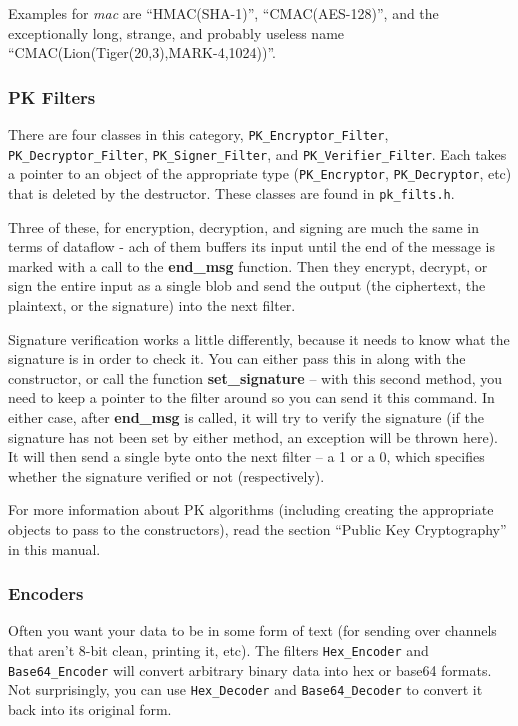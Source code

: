 \documentclass{article}
\newcommand{\filename}[1]{\texttt{#1}}
\newcommand{\function}[1]{\textbf{#1}}
\newcommand{\type}[1]{\texttt{#1}}
\renewcommand{\arg}[1]{\textsl{#1}}
\begin{document}
Examples for \arg{mac} are ``HMAC(SHA-1)'', ``CMAC(AES-128)'', and the
exceptionally long, strange, and probably useless name
``CMAC(Lion(Tiger(20,3),MARK-4,1024))''.

\subsubsection{PK Filters}

There are four classes in this category, \type{PK\_Encryptor\_Filter},
\type{PK\_Decryptor\_Filter}, \type{PK\_Signer\_Filter}, and
\type{PK\_Verifier\_Filter}. Each takes a pointer to an object of the
appropriate type (\type{PK\_Encryptor}, \type{PK\_Decryptor}, etc) that is
deleted by the destructor. These classes are found in \filename{pk\_filts.h}.

Three of these, for encryption, decryption, and signing are much the
same in terms of dataflow - ach of them buffers its input until the
end of the message is marked with a call to the \function{end\_msg}
function. Then they encrypt, decrypt, or sign the entire input as a
single blob and send the output (the ciphertext, the plaintext, or the
signature) into the next filter.

Signature verification works a little differently, because it needs to
know what the signature is in order to check it. You can either pass
this in along with the constructor, or call the function
\function{set\_signature} -- with this second method, you need to keep
a pointer to the filter around so you can send it this command. In
either case, after \function{end\_msg} is called, it will try to
verify the signature (if the signature has not been set by either
method, an exception will be thrown here). It will then send a single
byte onto the next filter -- a 1 or a 0, which specifies whether the
signature verified or not (respectively).

For more information about PK algorithms (including creating the
appropriate objects to pass to the constructors), read the section
``Public Key Cryptography'' in this manual.

\subsubsection{Encoders}

Often you want your data to be in some form of text (for sending over channels
that aren't 8-bit clean, printing it, etc). The filters \type{Hex\_Encoder}
and \type{Base64\_Encoder} will convert arbitrary binary data into hex or
base64 formats. Not surprisingly, you can use \type{Hex\_Decoder} and
\type{Base64\_Decoder} to convert it back into its original form.
\end{document}
